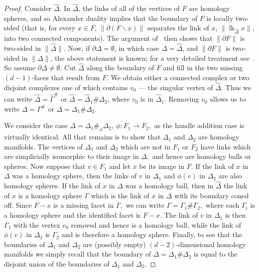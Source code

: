 \documentclass[ALCO,ThmDefs,Unicode,epreuves]{cedram}
\DeclareMathOperator\lk{lk}
\newcommand{\complet}[1]{\hat{#1}}
\begin{document}
 \begin{proof}
		 Consider $\complet{\Delta}$. In $\complet{\Delta}$, the links of all of the vertices of $F$ are homology spheres, and so Alexander duality implies that the boundary of $F$ is locally two-sided (that is, for every $x\in F$, $\|\partial (F\backslash x)\|$ separates the link of $x$, $\|\lk_{\complet{\Delta}}x\|$, into two connected components). The argument of~\cite[Lemma~3.3]{Basak-Swartz} then shows that $\|\partial F\|$ is two-sided in $\|\complet{\Delta}\|$. Now, if $\partial\Delta=\emptyset$, in which case $\Delta=\complet{\Delta}$, and $\|\partial F\|$ is two-sided in $\|\Delta\|$, the above statement is known; for a very detailed treatment see~\cite[Lemma~3.3]{Bagch-Datta-LBT}. So assume $\partial\Delta\neq\emptyset$. Cut $\complet{\Delta}$ along the boundary of $F$ and fill in the two missing $(d-1)$-faces that result from $F$. We obtain either a connected complex or two disjoint complexes one of which contains $v_0$ --- the singular vertex of $\complet{\Delta}$. Thus we can write $\complet{\Delta}=\complet{\Gamma}^\#$ or $\complet{\Delta} = \complet{\Delta}_1 \# \Delta_2$, where $v_0$ is in $\complet{\Delta}_1$. Removing $v_0$ allows us to write $\Delta= \Gamma^\#$ or $\Delta= \Delta_1 \# \Delta_2$. 
		
 We consider the case $\Delta = \Delta_1 \#_\phi \Delta_2,~\phi:F_1 \to F_2,$ as the handle addition case is virtually identical. All that remains is to show that $\Delta_1$ and $\Delta_2$ are homology manifolds. The vertices of $\Delta_1$ and $\Delta_2$ which are not in $F_1$ or $F_2$ have links which are simplicially isomorphic to their image in $\Delta, $ and hence are homology balls or spheres. Now suppose that $v \in F_1$ and let $x$ be its image in $F.$ If the link of $x$ in $\Delta$ was a homology sphere, then the links of $v$ in $\Delta_1$ and $\phi(v)$ in $\Delta_2$ are also homology spheres. If the link of $x$ in $\Delta$ was a homology ball, then in $\complet{\Delta}$ the link of $x$ is a homology sphere $\Gamma$ which is the link of $x$ in $\Delta$ with its boundary coned off. Since $F-x$ is a missing facet in $\Gamma,$ we can write $\Gamma = \Gamma_1 \# \Gamma_2,$ where each $\Gamma_i$ is a homology sphere and the identified facet is $F-x.$ 
 The link of $v$ in $\Delta_1$ is then $\Gamma_1$ with the vertex $v_0$ removed and hence is a homology ball, 
while the link of $\phi(v)$ in $\Delta_2$ is $\Gamma_2$ and is therefore a homology sphere. Finally, to see that the boundaries of $\Delta_1$ and $ \Delta_2$ are (possibly empty) $(d-2)$-dimensional homology manifolds we simply recall that the boundary of $\Delta = \Delta_1 \# \Delta_2$ is equal to the disjoint union of the boundaries of $\Delta_1$ and $\Delta_2.$ 
 \end{proof}
\end{document}
